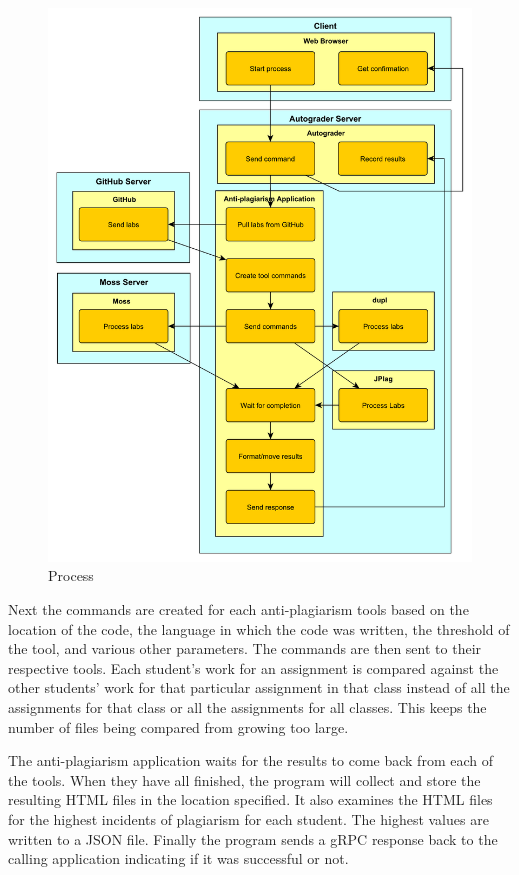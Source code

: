 \documentclass[10pt,journal,compsoc]{IEEEtran}
\begin{document}
			\begin{figure}[h!]
				\includegraphics[width=1.0\textwidth]{process2.pdf}
				\caption{Process}
				\label{fig:process}
			\end{figure}
	
			Next the commands are created for each anti-plagiarism tools based on the location of the code, the language in which the code was written, the threshold of the tool, and various other parameters. The commands are then sent to their respective tools. Each student's work for an assignment is compared against the other students' work for that particular assignment in that class instead of all the assignments for that class or all the assignments for all classes. This keeps the number of files being compared from growing too large.
			
			The anti-plagiarism application waits for the results to come back from each of the tools. When they have all finished, the program will collect and store the resulting HTML files in the location specified. It also examines the HTML files for the highest incidents of plagiarism for each student. The highest values are written to a JSON file. Finally the program sends a gRPC response back to the calling application indicating if it was successful or not.
			
\end{document}
